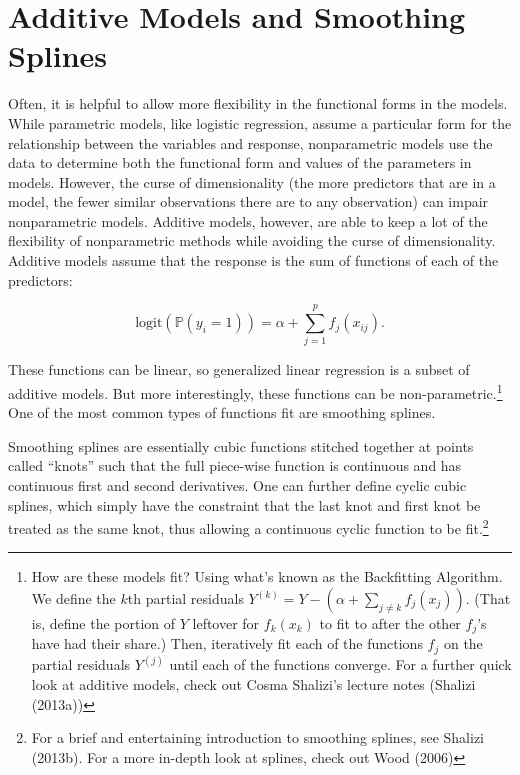 \documentclass[12pt,twoside]{reedthesis}
\begin{document}
  \section{Additive Models and Smoothing
  Splines}\label{additive-models-and-smoothing-splines}
  
  Often, it is helpful to allow more flexibility in the functional forms
  in the models. While parametric models, like logistic regression, assume
  a particular form for the relationship between the variables and
  response, nonparametric models use the data to determine both the
  functional form and values of the parameters in models. However, the
  curse of dimensionality (the more predictors that are in a model, the
  fewer similar observations there are to any observation) can impair
  nonparametric models. Additive models, however, are able to keep a lot
  of the flexibility of nonparametric methods while avoiding the curse of
  dimensionality. Additive models assume that the response is the sum of
  functions of each of the predictors:
  
  \[\text{logit} (\mathbb{P}(y_i = 1)) =
  \alpha + \sum_{j = 1}^p f_j(x_{ij}).\]
  
  These functions can be linear, so generalized linear regression is a
  subset of additive models. But more interestingly, these functions can
  be non-parametric.\footnote{How are these models fit? Using what's known
    as the Backfitting Algorithm. We define the \(k\)th partial residuals
    \(Y^{(k)} = Y - \left(\alpha + \sum_{j \neq k} f_j(x_j)\right)\).
    (That is, define the portion of \(Y\) leftover for \(f_k(x_k)\) to fit
    to after the other \(f_j\)'s have had their share.) Then, iteratively
    fit each of the functions \(f_j\) on the partial residuals \(Y^{(j)}\)
    until each of the functions converge. For a further quick look at
    additive models, check out Cosma Shalizi's lecture notes (Shalizi
    (2013a))} One of the most common types of functions fit are smoothing
  splines.
  
  Smoothing splines are essentially cubic functions stitched together at
  points called ``knots'' such that the full piece-wise function is
  continuous and has continuous first and second derivatives. One can
  further define cyclic cubic splines, which simply have the constraint
  that the last knot and first knot be treated as the same knot, thus
  allowing a continuous cyclic function to be fit.\footnote{For a brief
    and entertaining introduction to smoothing splines, see Shalizi
    (2013b). For a more in-depth look at splines, check out Wood (2006)}
  
\end{document}
